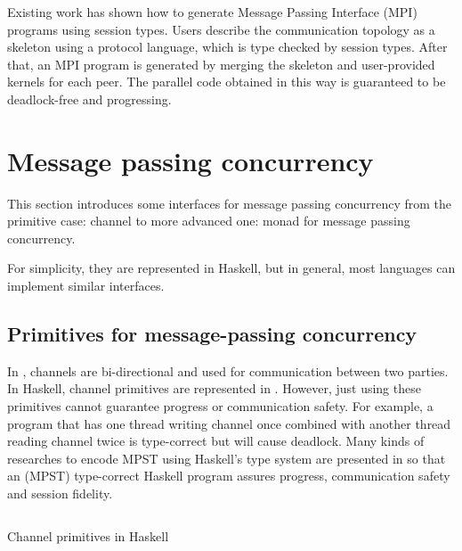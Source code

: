 Existing work\cite{ngProtocolsDefault2015} has shown how to generate Message Passing Interface (MPI) \cite{MessagePassingInterface} programs using session types. Users describe the communication topology as a skeleton using a protocol language, which is type checked by session types. After that, an MPI program is generated by merging the skeleton and user-provided kernels for each peer. The parallel code obtained in this way is guaranteed to be deadlock-free and progressing. 

\section{Message passing concurrency} \label{b:mo}
This section introduces some interfaces for message passing concurrency from the primitive case: channel to more advanced one: monad for message passing concurrency.

For simplicity, they are represented in Haskell, but in general, most languages can implement similar interfaces. 
\subsection{Primitives for message-passing concurrency} \label{b:mo:mpc}
In , channels are bi-directional and used for communication between two parties. In Haskell, channel primitives are represented in . However, just using these primitives cannot guarantee progress or communication safety. For example, a program that has one thread writing channel once combined with another thread reading channel twice is type-correct but will cause deadlock. Many kinds of researches to encode MPST using Haskell's type system are presented in \cite{orchardSessionTypesLinearity2017} so that an (MPST) type-correct Haskell program assures progress, communication safety and session fidelity.
\begin{listing}[ht]
  \inputminted{haskell}{background/mo-chan.hs}
  \caption{Channel primitives in Haskell}
  \label{b:mo:c1}
\end{listing}
